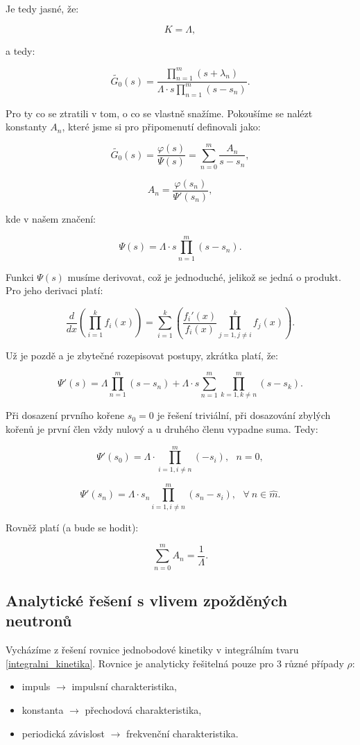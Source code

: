 Je tedy jasné, že:

$$ K = \Lambda, $$

a tedy:

$$ \tilde{G_0}(s) = \dfrac{\prod_{n=1}^m (s+\lambda_n)}{\Lambda \cdot s \prod_{n=1}^m (s-s_n)}. $$

Pro ty co se ztratili v tom, o co se vlastně snažíme. Pokoušíme se nalézt konstanty $A_n$, které jsme si pro připomenutí definovali jako:

$$ \tilde{G_0}(s) = \dfrac{\varphi(s)}{\Psi(s)} = \sum_{n=0}^m \dfrac{A_n}{s-s_n}, $$

$$ A_n = \dfrac{\varphi(s_n)}{\Psi'(s_n)}, $$

kde v našem značení:

$$ \Psi(s) = \Lambda \cdot s \prod_{n=1}^m (s-s_n). $$

Funkci $\Psi(s)$ musíme derivovat, což je jednoduché, jelikož se jedná o produkt. Pro jeho derivaci platí:

$$ \dfrac{d}{dx} \left ( \prod_{i=1}^k f_i(x) \right ) = \sum_{i=1}^k \left ( \dfrac{f_i'(x)}{f_i(x)} \prod_{j=1,j \neq i}^k f_j(x) \right ). $$

Už je pozdě a je zbytečné rozepisovat postupy, zkrátka platí, že:

$$ \Psi'(s) = \Lambda \prod_{n=1}^m (s-s_n) + \Lambda \cdot s \sum_{n=1}^m \prod_{k=1, k \neq n}^m (s-s_k). $$

Při dosazení prvního kořene $s_0 = 0$ je řešení triviální, při dosazování zbylých kořenů je první člen vždy nulový a u druhého členu vypadne suma. Tedy:

$$ \Psi'(s_0) = \Lambda \cdot \prod_{i=1, i \neq n}^m (-s_i), \: \: \: n = 0, $$

$$ \Psi'(s_n) = \Lambda \cdot s_n \prod_{i=1, i \neq n}^m (s_n-s_i), \: \: \: \forall \: n \in \widehat{m}. $$

Rovněž platí (a bude se hodit):

$$ \sum_{n=0}^m A_n = \dfrac{1}{\Lambda}. $$

\subsection{Analytické řešení s vlivem zpožděných neutronů}

Vycházíme z řešení rovnice jednobodové kinetiky v integrálním tvaru \eqref{integralni_kinetika}. Rovnice je analyticky řešitelná pouze pro 3 různé případy $\rho$:

\begin{itemize}
  \item impuls $\rightarrow$ impulsní charakteristika,
  \item konstanta $\rightarrow$ přechodová charakteristika,
  \item periodická závislost $\rightarrow$ frekvenční charakteristika.
\end{itemize}

